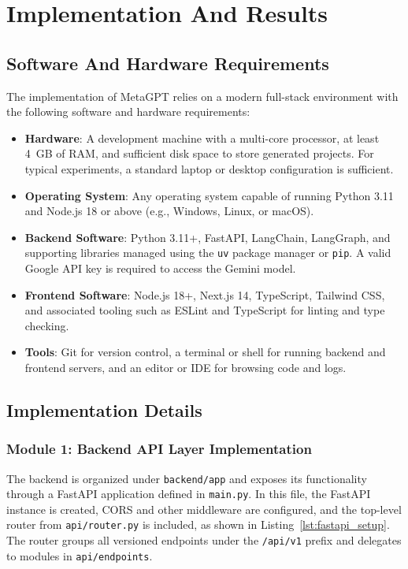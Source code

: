 
\chapter{Implementation And Results}
\section{Software And Hardware Requirements}

The implementation of MetaGPT relies on a modern full-stack environment with the following software and hardware requirements:
\begin{itemize}
    \item \textbf{Hardware}: A development machine with a multi-core processor, at least 4~GB of RAM, and sufficient disk space to store generated projects. For typical experiments, a standard laptop or desktop configuration is sufficient.
    \item \textbf{Operating System}: Any operating system capable of running Python 3.11 and Node.js 18 or above (e.g., Windows, Linux, or macOS).
    \item \textbf{Backend Software}: Python 3.11+, FastAPI, LangChain, LangGraph, and supporting libraries managed using the \texttt{uv} package manager or \texttt{pip}. A valid Google API key is required to access the Gemini model.
    \item \textbf{Frontend Software}: Node.js 18+, Next.js 14, TypeScript, Tailwind CSS, and associated tooling such as ESLint and TypeScript for linting and type checking.
    \item \textbf{Tools}: Git for version control, a terminal or shell for running backend and frontend servers, and an editor or IDE for browsing code and logs.
\end{itemize}

\section{Implementation Details}

\subsection*{Module 1: Backend API Layer Implementation}

The backend is organized under \texttt{backend/\allowbreak{}app} and exposes its functionality through a FastAPI application defined in \texttt{main.py}. In this file, the FastAPI instance is created, CORS and other middleware are configured, and the top-level router from \texttt{api/\allowbreak{}router.py} is included, as shown in Listing~\ref{lst:fastapi_setup}. The router groups all versioned endpoints under the \texttt{/\allowbreak{}api/\allowbreak{}v1} prefix and delegates to modules in \texttt{api/\allowbreak{}endpoints}.

